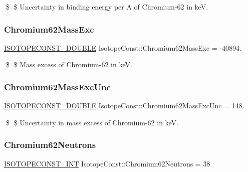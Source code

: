 \$ \$ Uncertainty in binding energy per A of Chromium-\/62 in keV. \mbox{\label{group___isotope_const-_chromium-_cr62_ga02dfadfd5a0fb5b51e20fc3e453c2919}} 
\subsubsection{\texorpdfstring{Chromium62\+Mass\+Exc}{Chromium62MassExc}}
{\footnotesize\ttfamily \mbox{\hyperlink{group___isotope_const-_macros_ga8f45a7272ce02c0b4c65c44636ed719a}{I\+S\+O\+T\+O\+P\+E\+C\+O\+N\+S\+T\+\_\+\+D\+O\+U\+B\+LE}} Isotope\+Const\+::\+Chromium62\+Mass\+Exc = -\/40894.}

\$ \$ Mass excess of Chromium-\/62 in keV. \mbox{\label{group___isotope_const-_chromium-_cr62_ga9ae9f8ec01cb20b9e02e325b73e9e9f6}} 
\subsubsection{\texorpdfstring{Chromium62\+Mass\+Exc\+Unc}{Chromium62MassExcUnc}}
{\footnotesize\ttfamily \mbox{\hyperlink{group___isotope_const-_macros_ga8f45a7272ce02c0b4c65c44636ed719a}{I\+S\+O\+T\+O\+P\+E\+C\+O\+N\+S\+T\+\_\+\+D\+O\+U\+B\+LE}} Isotope\+Const\+::\+Chromium62\+Mass\+Exc\+Unc = 148.}

\$ \$ Uncertainty in mass excess of Chromium-\/62 in keV. \mbox{\label{group___isotope_const-_chromium-_cr62_ga5b707fea202b89ddd84513e8ea53d451}} 
\subsubsection{\texorpdfstring{Chromium62\+Neutrons}{Chromium62Neutrons}}
{\footnotesize\ttfamily \mbox{\hyperlink{group___isotope_const-_macros_ga5f18360b3e99483a35c32d789e62621c}{I\+S\+O\+T\+O\+P\+E\+C\+O\+N\+S\+T\+\_\+\+I\+NT}} Isotope\+Const\+::\+Chromium62\+Neutrons = 38}

